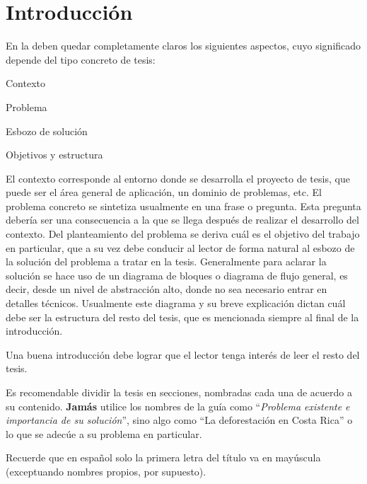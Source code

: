 
\chapter{Introducción}
\label{chp:intro}

En la  deben quedar completamente claros los siguientes
aspectos, cuyo significado depende del tipo concreto de tesis:

\begin{compactitem}
\item Contexto
\item Problema
\item Esbozo de solución
\item Objetivos y estructura
\end{compactitem}

El contexto corresponde al entorno donde se desarrolla el proyecto de
tesis, que puede ser el área general de aplicación, un dominio de
problemas, etc. El problema concreto se sintetiza usualmente en una
frase o pregunta. Esta pregunta debería ser una consecuencia a la que
se llega después de realizar el desarrollo del contexto. Del
planteamiento del problema se deriva cuál es el objetivo del trabajo
en particular, que a su vez debe conducir al lector de forma natural
al esbozo de la solución del problema a tratar en la
tesis. Generalmente para aclarar la solución se hace uso de un
diagrama de bloques o diagrama de flujo general, es decir, desde un
nivel de abstracción alto, donde no sea necesario entrar en detalles
técnicos. Usualmente este diagrama y su breve explicación dictan cuál
debe ser la estructura del resto del tesis, que es mencionada siempre
al final de la introducción.

Una buena introducción debe lograr que el lector tenga interés de leer el resto
del tesis.

Es recomendable dividir la tesis en secciones, nombradas cada una de acuerdo a
su contenido. \textbf{Jamás} utilice los nombres de la guía como
``\emph{Problema existente e importancia de su solución}'', sino algo como ``La
deforestación en Costa Rica'' o lo que se adecúe a su problema en particular.

Recuerde que en español solo la primera letra del título va en mayúscula
(exceptuando nombres propios, por supuesto).

